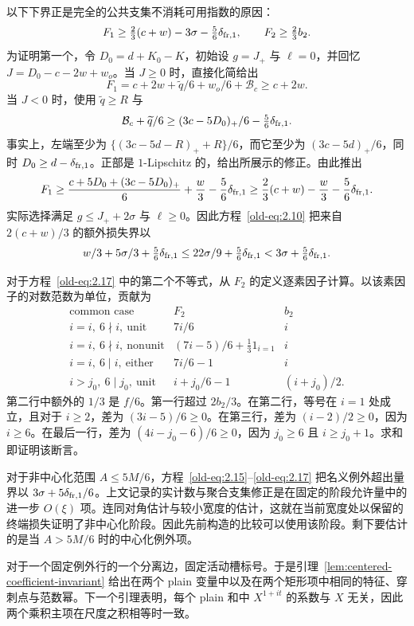 \documentclass[11pt,a4paper]{article}
\numberwithin{equation}{section}
\numberwithin{figure}{section}
\theoremstyle{definition}
\theoremstyle{remark}
\begin{document}
以下下界正是完全的公共支集不消耗可用指数的原因：
\begin{equation}
 F_1\ge\tfrac23(c+w)-3\sigma-\tfrac56\delta_{{\rm fr},1},\qquad
 F_2\ge\tfrac23b_2.
 \label{old-eq:2.17}
\end{equation}
为证明第一个，令 \(D_0=d+K_0-K\)，初始设 \(g=J_+\) 与 \(\ell=0\)，并回忆 \(J=D_0-c-2w+w_o\)。当 \(J\ge0\) 时，直接化简给出
\[
 F_1=c+2w+\widetilde q/6+w_o/6+\mathcal B_c
       \ge c+2w.
\]
当 \(J<0\) 时，使用 \(\widetilde q\ge R\) 与
\[
 \mathcal B_c+\widetilde q/6
 \ge (3c-5D_0)_+/6-\tfrac56\delta_{{\rm fr},1}.
\]
事实上，左端至少为 \(\{(3c-5d-R)_++R\}/6\)，而它至少为 \((3c-5d)_+/6\)，同时 \(D_0\ge d-\delta_{{\rm fr},1}\)。正部是 \(1\)-Lipschitz 的，给出所展示的修正。由此推出
\[
 F_1\ge
 \frac{c+5D_0+(3c-5D_0)_+}{6}+\frac w3
       -\frac56\delta_{{\rm fr},1}
 \ge\frac23(c+w)-\frac w3-\frac56\delta_{{\rm fr},1}.
\]
实际选择满足 \(g\le J_++2\sigma\) 与 \(\ell\ge0\)。因此方程~\eqref{old-eq:2.10} 把来自 \(2(c+w)/3\) 的额外损失界以
\[
 w/3+5\sigma/3+\tfrac56\delta_{{\rm fr},1}
 \le22\sigma/9+\tfrac56\delta_{{\rm fr},1}
 <3\sigma+\tfrac56\delta_{{\rm fr},1}.
\]

对于方程~\eqref{old-eq:2.17} 中的第二个不等式，从 \(F_2\) 的定义逐素因子计算。以该素因子的对数范数为单位，贡献为
\[
 \begin{array}{c|c|c}
 \text{common case}&F_2&b_2\\ \hline
 i=i,\ 6\nmid i,\ \text{unit}&7i/6&i\\
 i=i,\ 6\nmid i,\ \text{nonunit}
       &(7i-5)/6+\tfrac13 1_{i=1}&i\\
 i=i,\ 6\mid i,\ \text{either}&7i/6-1&i\\
 i>j_0,\ 6\mid j_0,\ \text{unit}
       &i+j_0/6-1&(i+j_0)/2 .
 \end{array}
\]
第二行中额外的 \(1/3\) 是 \(f/6\)。第一行超过 \(2b_2/3\)。在第二行，等号在 \(i=1\) 处成立，且对于 \(i\ge2\)，差为 \((3i-5)/6\ge0\)。在第三行，差为 \((i-2)/2\ge0\)，因为 \(i\ge6\)。在最后一行，差为 \((4i-j_0-6)/6\ge0\)，因为 \(j_0\ge6\) 且 \(i\ge j_0+1\)。求和即证明该断言。

对于非中心化范围 \(A\le5M/6\)，方程~\eqref{old-eq:2.15}--\eqref{old-eq:2.17} 把名义例外超出量界以 \(3\sigma+5\delta_{{\rm fr},1}/6\)。上文记录的实计数与聚合支集修正是在固定的阶段允许量中的进一步 \(O(\xi)\) 项。连同对角估计与较小宽度的估计，这就在当前宽度处以保留的终端损失证明了非中心化阶段。因此先前构造的比较可以使用该阶段。剩下要估计的是当 \(A>5M/6\) 时的中心化例外项。

对于一个固定例外行的一个分离边，固定活动槽标号。于是引理~\ref{lem:centered-coefficient-invariant} 给出在两个 plain 变量中以及在两个矩形项中相同的特征、穿刺点与范数幂。下一个引理表明，每个 plain 和中 \(X^{1+it}\) 的系数与 \(X\) 无关，因此两个乘积主项在尺度之积相等时一致。
\end{document}
